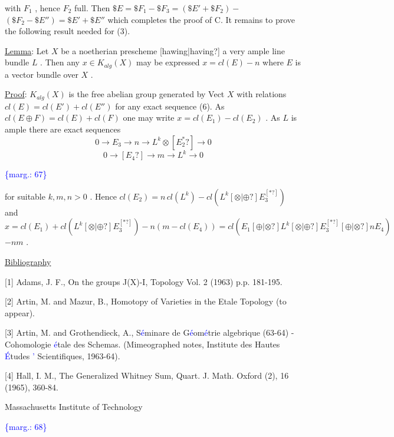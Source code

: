 \documentclass[11pt]{article}
\newcommand{\scanpage}[1]{\par\bigskip\noindent{\small\sffamily[scan #1]}\par}
\newcommand{\mspage}[1]{{\small\sffamily[p.\,#1]}}
\newcommand{\hand}[1]{\textcolor{blue}{#1}}
\newcommand{\margin}[1]{\textcolor{blue}{\{\textsf{marg.:} #1\}}}
\newcommand{\uline}[1]{\underline{#1}}
\newcommand{\unsure}[1]{[#1?]}
\begin{document}
with $F_1$ , hence $F_2$ full. Then $\$E = \$F_1 - \$F_3 = (\$E' + \$F_2) -$
$(\$F_2 - \$E'') = \$E' + \$E''$ which completes the proof of C.
It remains to prove the following result needed for (3).

\uline{Lemma}: Let $X$ be a noetherian prescheme \unsure{hawing|having} a very
ample line bundle $L$ . Then any $x \in K_{alg}(X)$ may be expressed
$x = cl(E) - n$ where $E$ is a vector bundle over $X$ .

\uline{Proof}: $K_{alg}(X)$ is the free abelian group generated by Vect $X$
with relations $cl(E) = cl(E') + cl(E'')$ for any exact sequence (6).
As $cl(E \oplus F) = cl(E) + cl(F)$ one may write $x = cl(E_1) - cl(E_2)$ .
As $L$ is ample there are exact sequences
\[ 0 \to E_3 \to n \to L^k \otimes \unsure{E_2^*} \to 0 \]
\[ 0 \to \unsure{E_4} \to m \to L^k \to 0 \]

\margin{67}

\clearpage
\scanpage{162-5/68}
\mspage{- 12 -}

for suitable $k,m,n > 0$ . Hence $cl(E_2) = n\,cl(L^k) - cl(L^k \unsure{\otimes|\oplus} E_3^{\unsure{*}})$
and $x = cl(E_1) + cl(L^k \unsure{\otimes|\oplus} E_3^{\unsure{*}}) - n(m - cl(E_4)) = cl(E_1 \unsure{\oplus|\otimes} L^k \unsure{\otimes|\oplus} E_3^{\unsure{*}} \unsure{\oplus|\otimes} nE_4)$
$- nm$ .

\uline{Bibliography}

[1] Adams, J. F., On the groups J(X)-I, Topology Vol. 2 (1963)
p.p. 181-195.

[2] Artin, M. and Mazur, B., Homotopy of Varieties in the
Etale Topology (to appear).

[3] Artin, M. and Grothendieck, A., S\hand{\'e}minare de G\hand{\'e}om\hand{\'e}trie
algebrique (63-64) - Cohomologie \hand{\'e}tale des Schemas.
(Mimeographed notes, Institute des Hautes \hand{\'E}tudes \hand{'}
Scientifiques, 1963-64).

[4] Hall, I. M., The Generalized Whitney Sum, Quart. J. Math.
Oxford (2), 16 (1965), 360-84.

Massachusetts Institute of Technology

\margin{68}
\end{document}
